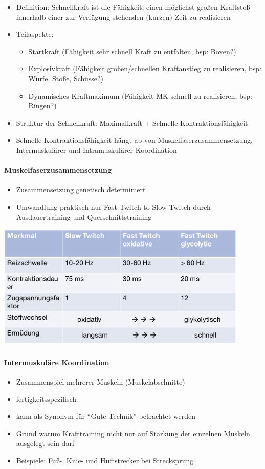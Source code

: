 \begin{itemize}
    \item Definition: Schnellkraft ist die Fähigkeit, einen möglichst großen Kraftstoß innerhalb einer zur Verfügung stehenden (kurzen) Zeit zu realisieren
    \item Teilaspekte:
    \begin{itemize}
        \item Startkraft (Fähigkeit sehr schnell Kraft zu entfalten, bsp: Boxen?)
        \item Explosivkraft (Fähigkeit großen/schnellen Kraftanstieg zu realisieren, bsp: Würfe, Stöße, Schüsse?)
        \item Dynamisches Kraftmaximum (Fähigkeit MK schnell zu realisieren, bsp: Ringen?)
    \end{itemize}
    \item Struktur der Schnellkraft: Maximalkraft + Schnelle Kontraktionsfähigkeit
    \item Schnelle Kontraktionsfähigkeit hängt ab von Muskelfaserzusammensetzung, Intermuskulärer und Intramuskulärer Koordination
\end{itemize}

\paragraph{Muskelfaserzusammensetzung}
\begin{itemize}
    \item Zusammensetzung genetisch determiniert
    \item Umwandlung praktisch nur Fast Twitch to Slow Twitch durch Ausdauertraining und Querschnittstraining
\end{itemize}
\includegraphics[width=0.9\textwidth]{pictures/muskelfaserzusammensetzung}

\paragraph{Intermuskuläre Koordination}
\begin{itemize}
    \item Zusammenspiel mehrerer Muskeln (Muskelabschnitte)
    \item fertigkeitsspezifisch
    \item kann als Synonym für ``Gute Technik'' betrachtet werden
    \item Grund warum Krafttraining nicht nur auf Stärkung der einzelnen Muskeln ausgelegt sein darf
    \item Beispiele: Fuß-, Knie- und Hüftstrecker bei Strecksprung
\end{itemize}

